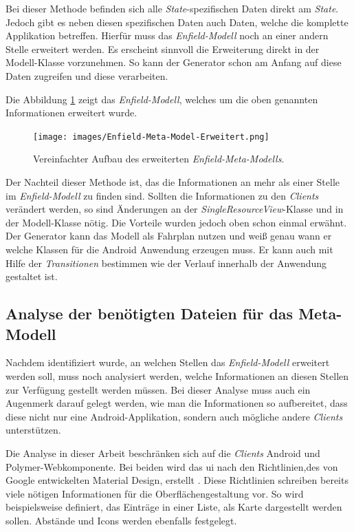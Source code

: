 Bei dieser Methode befinden sich alle \textit{State}-spezifischen Daten direkt am \textit{State}. Jedoch gibt es neben diesen spezifischen Daten auch Daten, welche die komplette Applikation betreffen. Hierfür muss das \textit{Enfield-Modell} noch an einer andern Stelle erweitert werden. 
Es erscheint sinnvoll die Erweiterung direkt in der Modell-Klasse vorzunehmen. So kann der Generator schon am Anfang auf diese Daten zugreifen und diese verarbeiten.

Die Abbildung \ref{fig:enfield-model-extended} zeigt das \textit{Enfield-Modell}, welches um die oben genannten Informationen erweitert wurde.

\begin{figure}[H]
	\begin{center}
		\texttt{[image: images/Enfield-Meta-Model-Erweitert.png]}
		\caption{Vereinfachter Aufbau des erweiterten \textit{Enfield-Meta-Modells}.}
		\label{fig:enfield-model-extended}
	\end{center}
\end{figure}

Der Nachteil dieser Methode ist, das die Informationen an mehr als einer Stelle im \textit{Enfield-Modell} zu finden sind. Sollten die Informationen zu den \textit{Clients} verändert werden, so sind Änderungen an der \textit{SingleResourceView}-Klasse und in der Modell-Klasse nötig. Die Vorteile wurden jedoch oben schon einmal erwähnt. Der Generator kann das Modell als Fahrplan nutzen und weiß genau wann er welche Klassen für die Android Anwendung erzeugen muss. Er kann auch mit Hilfe der \textit{Transitionen} bestimmen wie der Verlauf innerhalb der Anwendung gestaltet ist.

\newpage
\subsection{Analyse der benötigten Dateien für das Meta-Modell}

Nachdem identifiziert wurde, an welchen Stellen das \textit{Enfield-Modell} erweitert werden soll, muss noch analysiert werden, welche Informationen an diesen Stellen zur Verfügung gestellt werden müssen. Bei dieser Analyse muss auch ein Augenmerk darauf gelegt werden, wie man die Informationen so aufbereitet, dass diese nicht nur eine Android-Applikation, sondern auch mögliche andere \textit{Clients} unterstützen.

Die Analyse in dieser Arbeit beschränken sich auf die \textit{Clients} Android und Polymer-Webkomponente. Bei beiden wird das \acf{ui} nach den Richtlinien,des von Google entwickelten Material Design, erstellt \cite{material}. Diese Richtlinien schreiben bereits viele nötigen Informationen für die Oberflächengestaltung vor. So wird beispielsweise definiert, das Einträge in einer Liste, als Karte dargestellt werden sollen. Abstände und Icons werden ebenfalls festgelegt.


